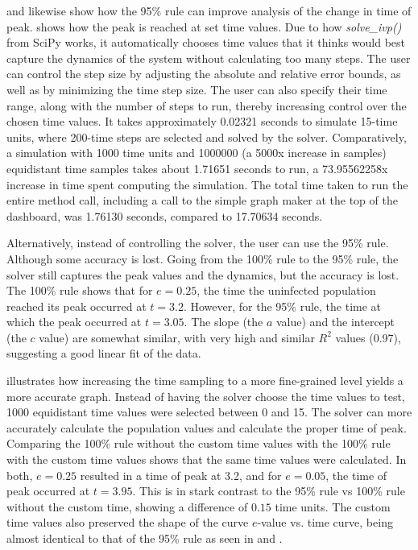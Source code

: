  and  likewise show how the 95\% rule can improve analysis of the change in time of peak. 
 shows how the peak is reached at set time values. 
Due to how \textit{solve\_ivp()} from SciPy works, it automatically chooses time values that it thinks would best capture the dynamics of the system without calculating too many steps. 
The user can control the step size by adjusting the absolute and relative error bounds, as well as by minimizing the time step size. 
The user can also specify their time range, along with the number of steps to run, thereby increasing control over the chosen time values. 
It takes approximately 0.02321 seconds to simulate 15-time units, where 200-time steps are selected and solved by the solver. 
Comparatively, a simulation with 1000 time units and 1000000 (a 5000x increase in samples) equidistant time samples takes about 1.71651 seconds to run, a 73.95562258x increase in time spent computing the simulation. 
The total time taken to run the entire method call, including a call to the simple graph maker at the top of the dashboard, was 1.76130 seconds, compared to 17.70634 seconds. 

Alternatively, instead of controlling the solver, the user can use the 95\% rule.
Although some accuracy is lost. 
Going from the 100\% rule to the 95\% rule, the solver still captures the peak values and the dynamics, but the accuracy is lost. 
The 100\% rule shows that for $e=0.25$, the time the uninfected population reached its peak occurred at $t=3.2$. 
However, for the 95\% rule, the time at which the peak occurred at $t=3.05$. 
The slope (the $a$ value) and the intercept (the $c$ value) are somewhat similar, with very high and similar $R^2$ values (0.97), suggesting a good linear fit of the data. 

 illustrates how increasing the time sampling to a more fine-grained level yields a more accurate graph. 
Instead of having the solver choose the time values to test, 1000 equidistant time values were selected between 0 and 15. 
The solver can more accurately calculate the population values and calculate the proper time of peak. 
Comparing the 100\% rule without the custom time values with the 100\% rule with the custom time values shows that the same time values were calculated. 
In both, $e=0.25$ resulted in a time of peak at 3.2, and for $e=0.05$, the time of peak occurred at $t=3.95$. 
This is in stark contrast to the 95\% rule vs 100\% rule without the custom time, showing a difference of $0.15$ time units. 
The custom time values also preserved the shape of the curve $e$-value vs. time curve, being almost identical to that of the 95\% rule as seen in  and . 

